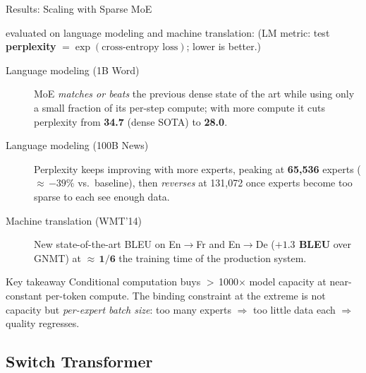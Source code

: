 \begin{frame}{Results: Scaling with Sparse MoE}

  \cite{shazeer2017moe} evaluated on language modeling and machine translation:
  {\small (LM metric: test \textbf{perplexity} $=\exp(\text{cross-entropy loss})$; lower is better.)}

  \vspace{0.3em}
  \begin{description}
    \item[Language modeling (1B Word)] MoE \emph{matches or beats} the previous dense state of the art while using only a small fraction of its per-step compute; with more compute it cuts perplexity from \textbf{34.7} (dense SOTA) to \textbf{28.0}.
    \item[Language modeling (100B News)] Perplexity keeps improving with more experts, peaking at \textbf{65{,}536} experts ($\approx$\,$-39\%$ vs.\ baseline), then \emph{reverses} at 131{,}072 once experts become too sparse to each see enough data.
    \item[Machine translation (WMT'14)] New state-of-the-art BLEU on En$\to$Fr and En$\to$De (\textbf{$+1.3$ BLEU} over GNMT) at $\approx$\,$\mathbf{1/6}$ the training time of the production system.
  \end{description}

  \vspace{0.3em}
  \begin{block}{Key takeaway}
    Conditional computation buys $>$\,1000$\times$ model capacity at near-constant per-token compute. The binding constraint at the extreme is not capacity but \emph{per-expert batch size}: too many experts $\Rightarrow$ too little data each $\Rightarrow$ quality regresses.
  \end{block}
\end{frame}

\subsection{Switch Transformer}

